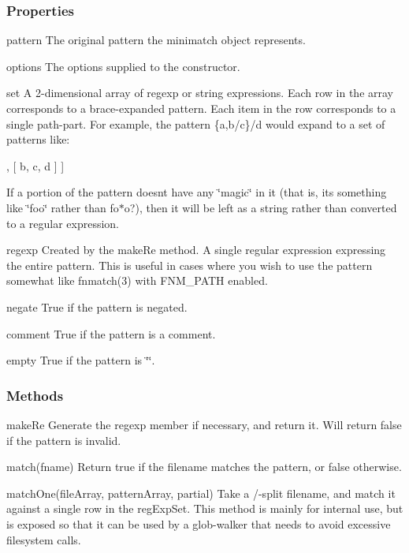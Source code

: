 \subsubsection*{Properties}


\begin{DoxyItemize}
\item {\ttfamily pattern} The original pattern the minimatch object represents.
\item {\ttfamily options} The options supplied to the constructor.
\item {\ttfamily set} A 2-\/dimensional array of regexp or string expressions. Each row in the array corresponds to a brace-\/expanded pattern. Each item in the row corresponds to a single path-\/part. For example, the pattern {\ttfamily \{a,b/c\}/d} would expand to a set of patterns like\+: \begin{DoxyVerb}  [ [ a, d ]
  , [ b, c, d ] ]
\end{DoxyVerb}


If a portion of the pattern doesn\textquotesingle{}t have any \char`\"{}magic\char`\"{} in it (that is, it\textquotesingle{}s something like {\ttfamily \char`\"{}foo\char`\"{}} rather than {\ttfamily fo$\ast$o?}), then it will be left as a string rather than converted to a regular expression.
\item {\ttfamily regexp} Created by the {\ttfamily make\+Re} method. A single regular expression expressing the entire pattern. This is useful in cases where you wish to use the pattern somewhat like {\ttfamily fnmatch(3)} with {\ttfamily F\+N\+M\+\_\+\+P\+A\+TH} enabled.
\item {\ttfamily negate} True if the pattern is negated.
\item {\ttfamily comment} True if the pattern is a comment.
\item {\ttfamily empty} True if the pattern is {\ttfamily \char`\"{}\char`\"{}}.
\end{DoxyItemize}

\subsubsection*{Methods}


\begin{DoxyItemize}
\item {\ttfamily make\+Re} Generate the {\ttfamily regexp} member if necessary, and return it. Will return {\ttfamily false} if the pattern is invalid.
\item {\ttfamily match(fname)} Return true if the filename matches the pattern, or false otherwise.
\item {\ttfamily match\+One(file\+Array, pattern\+Array, partial)} Take a {\ttfamily /}-\/split filename, and match it against a single row in the {\ttfamily reg\+Exp\+Set}. This method is mainly for internal use, but is exposed so that it can be used by a glob-\/walker that needs to avoid excessive filesystem calls.
\end{DoxyItemize}

